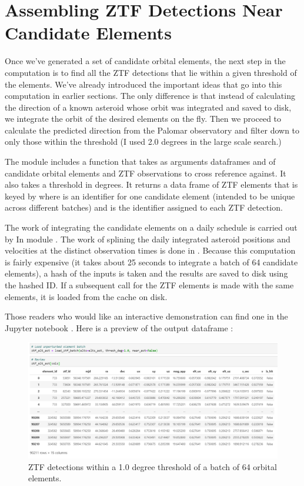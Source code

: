 \section{Assembling ZTF Detections Near Candidate Elements}
\label{section_ztf_elements}
Once we've generated a set of candidate orbital elements, 
the next step in the computation is to find all the ZTF detections that lie within a given threshold of the elements.
We've already introduced the important ideas that go into this computation in earlier sections.
The only difference is that instead of calculating the direction of a known asteroid whose orbit was integrated and saved to disk, 
we integrate the orbit of the desired elements on the fly.
Then we proceed to calculate the predicted direction from the Palomar observatory and filter down to only those within the threshold
(I used 2.0 degrees in the large scale search.)

The module  includes a function  that takes as arguments dataframes  and 
of candidate orbital elements and ZTF observations to cross reference against.
It also takes a threshold in degrees.
It returns a data frame of ZTF elements that is keyed by 
where  is an identifier for one candidate element (intended to be unique across different batches)
and  is the identifier assigned to each ZTF detection.

The work of integrating the candidate elements on a daily schedule is carried out by  In module .
The work of splining the daily integrated asteroid positions and velocities at the distinct observation times is done in .
Because this computation is fairly expensive (it takes about 25 seconds to integrate a batch of 64 candidate elements),
a hash of the inputs is taken and the results are saved to disk using the hashed ID.
If a subsequent call for the ZTF elements is made with the same elements, it is loaded from the cache on disk.

Those readers who would like an interactive demonstration can find one in the Jupyter notebook .
Here is a preview of the output dataframe :
\begin{figure}[hbt!]
\begin{center}
\includegraphics[width=1.0\textwidth]{../figs/elts/ztf_elt_dataframe.png}
\caption{ZTF detections within a 1.0 degree threshold of a batch of 64 orbital elements.}
\end{center}
\end{figure}

